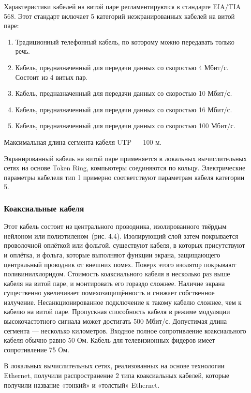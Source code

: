 \documentclass[
	a4paper,
	oneside,
	BCOR = 10mm,
	DIV = 12,
	12pt,
	headings = normal,
]{scrartcl}
\begin{document}
			Характеристики кабелей на витой паре регламентируются в стандарте EIA/TIA 568. Этот стандарт включает 5 категорий неэкранированных кабелей на витой паре:
			\begin{enumerate}
				\item Традиционный телефонный кабель, по которому можно передавать только речь. 
				\item Кабель, предназначенный для передачи данных со скоростью 4 Мбит/с. Состоит из 4 витых пар.
				\item Кабель, предназначенный для передачи данных со скоростью 10 Мбит/с.
				\item Кабель, предназначенный для передачи данных со скоростью 16 Мбит/с.
				\item Кабель, предназначенный для передачи данных со скоростью 100 Мбит/с.
			\end{enumerate}

			Максимальная длина сегмента кабеля UTP — 100 м.

			Экранированный кабель на витой паре применяется в локальных вычислительных сетях на основе Token Ring, компьютеры соединяются по кольцу. Электрические параметры кабелеля тип 1 примерно соответствуют параметрам кабеля категории 5. 

			\subsubsection{Коаксиальные кабеля}
				Этот кабель состоит из центрального проводника, изолированного твёрдым нейлоном или полиэтиленом~(рис. 4.4). Изолирующий слой затем покрывается проволочной оплёткой или фольгой, существуют кабеля, в которых присутствуют и оплётка, и фольга, которые выполняют функции экрана, защищающего центральный проводник от внешних помех. Поверх этого изолятор покрывают поливинилхлоридом. Стоимость коаксиального кабеля в несколько раз выше кабеля на витой паре, и монтировать его гораздо сложнее. Наличие экрана существенно увеличивает помехозащищённость и снижает собственное излучение. Несанкционированное подключение к такому кабелю сложнее, чем к кабелю на витой паре. Пропускная способность кабеля в режиме модуляции высокочастотного сигнала может достигать 500 Мбит/с. Допустимая длина сегмента — несколько километров. Входное полное сопротивление коаксиального кабеля обычно равно 50 Ом. Кабель для телевизионных фидеров имеет сопротивление 75 Ом.

				В локальных вычислительных сетях, реализованных на основе технологии Ethernet, получили распространение 2 типа коаксиальных кабелей, которые получили название «тонкий» и «толстый» Ethernet.
\end{document}
